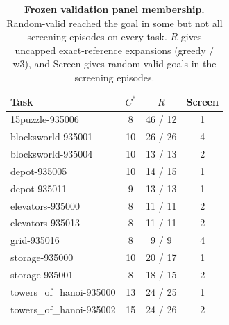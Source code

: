 \begin{table}[t]
\caption{\textbf{Frozen validation panel membership.} Random-valid reached the goal in some but not all screening episodes on every task. $R$ gives uncapped exact-reference expansions (greedy / w3), and Screen gives random-valid goals in the screening episodes.}
\label{tab:appendix-ladder-panel}
\centering\footnotesize
\setlength{\tabcolsep}{3pt}
\begin{tabular}{lccc}
\toprule[0.4mm]
\rowcolor{mygray}\textbf{Task} & \textbf{$C^*$} & \textbf{$R$} & \textbf{Screen} \\
\midrule
15puzzle-935006 & 8 & 46 / 12 & 1 \\
blocksworld-935001 & 10 & 26 / 26 & 4 \\
blocksworld-935004 & 10 & 13 / 13 & 2 \\
depot-935005 & 10 & 14 / 15 & 1 \\
depot-935011 & 9 & 13 / 13 & 1 \\
elevators-935000 & 8 & 11 / 11 & 2 \\
elevators-935013 & 8 & 11 / 11 & 2 \\
grid-935016 & 8 & 9 / 9 & 4 \\
storage-935000 & 10 & 20 / 17 & 1 \\
storage-935001 & 8 & 18 / 15 & 2 \\
towers\_of\_hanoi-935000 & 13 & 24 / 25 & 1 \\
towers\_of\_hanoi-935002 & 15 & 24 / 26 & 2 \\
\bottomrule
\end{tabular}
\end{table}

